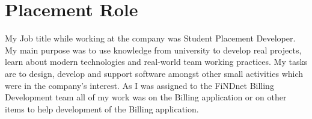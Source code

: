 \section{Placement Role}{
	My Job title while working at the company was Student Placement Developer. My main purpose was to use knowledge from university to develop real projects, learn about modern technologies and real-world team working practices. My tasks are to design, develop and support software amongst other small activities which were in the company's interest. As I was assigned to the FiNDnet Billing Development team all of my work was on the Billing application or on other items to help development of the Billing application.
}